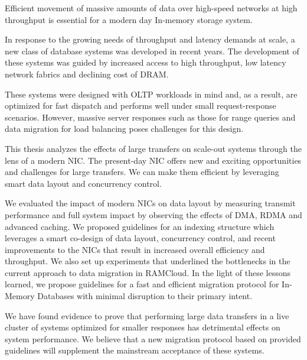 


Efficient movement of massive amounts of data over high-speed networks at high 
throughput is essential for a modern day In-memory storage system.

In response to the growing needs of throughput and latency demands at scale, a new class of database systems was developed in recent years.
The development of these systems was guided by increased access to high throughput, low latency network fabrics and declining cost of DRAM.

These systems were designed with OLTP workloads in mind and, as a result, are optimized for fast dispatch and performs well under small
request-response scenarios. However, massive server responses such as those for range queries and data migration for load balancing poses challenges for this design.  

This thesis analyzes the effects of large transfers on scale-out systems through the lens of a modern NIC.
The present-day NIC offers new and exciting opportunities and challenges for large transfers.
We can make them efficient by leveraging smart data layout and concurrency control.

We evaluated the impact of modern NICs on data layout by measuring transmit performance and full system impact by observing the effects of DMA, RDMA and advanced caching. 
We proposed guidelines for an indexing structure which leverages a smart co-design of data layout, concurrency control, and recent improvements to the NICs that result in increased overall efficiency and throughput. 
We also set up experiments that underlined the bottlenecks in the current approach to data migration in RAMCloud.
In the light of these lessons learned, we propose guidelines for a fast and efficient migration protocol for In-Memory Databases with minimal disruption to their primary intent.

We have found evidence to prove that performing large data transfers in a live cluster of systems optimized for smaller responses has detrimental effects on system performance. 
We believe that a new migration protocol based on provided guidelines will supplement the mainstream acceptance of these systems.